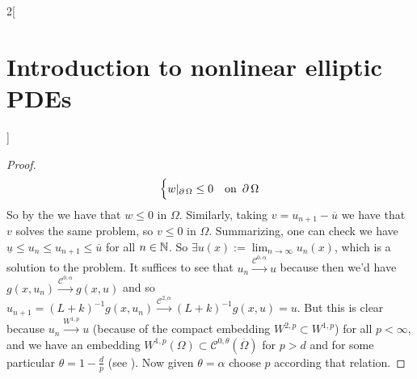 \documentclass[../../../main_math.tex]{subfiles}
\begin{document}
\begin{multicols}{2}[\section{Introduction to nonlinear elliptic PDEs}]
\begin{proof}
$$\begin{cases}
        w|_{\operatorname{\partial}{\Omega}}\leq 0 & \text{on }\operatorname{\partial}{\Omega}
      \end{cases}
    $$
    So by the  we have that $w\leq 0$ in $\Omega$. Similarly, taking $v=u_{n+1}-\overline{u}$ we have that $v$ solves the same problem, so $v\leq 0$ in $\Omega$. Summarizing, one can check we have $\underline{u}\leq u_n\leq u_{n+1}\leq \overline{u}$ for all $n\in\mathbb{N}$. So $\displaystyle\exists u(x):=\lim_{n\to\infty}u_n(x)$, which is a solution to the problem. It suffices to see that $u_n\overset{\mathcal{C}^{0,\alpha}}{\longrightarrow} u$ because then we'd have $g(x,u_n) \overset{\mathcal{C}^{0,\alpha}}{\longrightarrow} g(x,u)$ and so $u_{n+1}= (L+k)^{-1}g(x,u_n) \overset{\mathcal{C}^{2,\alpha}}{\longrightarrow} (L+k)^{-1}g(x,u)=u$. But this is clear because $u_n\overset{W^{1,p}}{\longrightarrow} u$ (because of the compact embedding $W^{2,p}\subset W^{1,p}$) for all $p<\infty$, and we have an embedding $W^{1,p}(\Omega)\subset \mathcal{C}^{0,\theta}(\overline{\Omega})$ for $p>d$ and for some particular $\theta=1-\frac{d}{p}$ (see ). Now given $\theta=\alpha$ choose $p$ according that relation.
  \end{proof}

\end{multicols}
\end{document}
